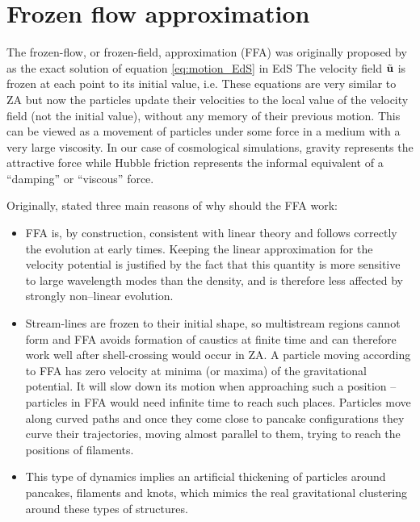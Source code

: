 \section{Frozen flow approximation}
The frozen-flow, or frozen-field, approximation (FFA) was originally proposed by \textcite{Matarrese:1992be} as the exact solution of equation \eqref{eq:motion_EdS} in EdS
The velocity field $\tilde{\mathbf u}$ is frozen at each point to its initial value, i.e.
These equations are very similar to ZA but now the particles update their velocities to the local value of the velocity field (not the initial value), without any memory of their previous motion. This can be viewed as a movement of particles under some force in a medium with a very large viscosity. In our case of cosmological simulations, gravity represents the attractive force while Hubble friction represents the informal equivalent of a ``damping'' or ``viscous'' force.

Originally, \textcite{Matarrese:1992be} stated three main reasons of why should the FFA work:
\begin{itemize}
\item FFA is, by construction, consistent with linear theory and follows correctly the evolution at early times. Keeping the linear approximation for the velocity potential is justified by the fact that this quantity is more sensitive to large wavelength modes than the density, and is therefore less affected by strongly non--linear evolution.
\item Stream-lines are frozen to their initial shape, so multistream regions cannot form and FFA avoids formation of caustics at finite time and can therefore work well after shell-crossing would occur in ZA. A particle moving according to FFA has zero velocity at minima (or maxima) of the gravitational potential. It will slow down its motion when approaching such a position -- particles in FFA would need infinite time to reach such places. Particles move along curved paths and once they come close to pancake configurations they curve their trajectories, moving almost parallel to them, trying to reach the positions of filaments.
\item This type of dynamics implies an artificial thickening of particles around pancakes, filaments and knots, which mimics the real gravitational clustering around these types of structures.
\end{itemize}

